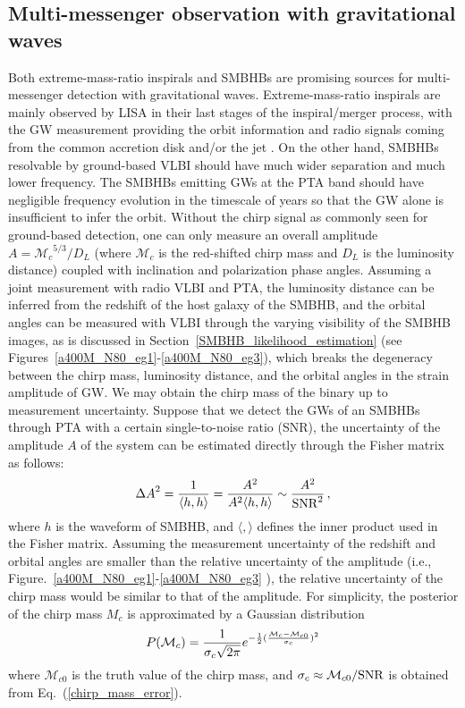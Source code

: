 \documentclass[twocolumn]{aastex62}
\def\m{\begin{eqnarray}}
\def\n{\end{eqnarray}}
\begin{document}
\subsection{Multi-messenger observation with gravitational waves}
\label{multimessenger}
%
Both extreme-mass-ratio inspirals and SMBHBs are promising sources for multi-messenger detection with gravitational waves. Extreme-mass-ratio inspirals are mainly observed by LISA in their last stages of the inspiral/merger process, with the GW measurement providing the orbit information and  radio signals coming from the common accretion disk and/or the jet \citep{Pan:2021ksp,Pan:2021oob}. On the other hand, SMBHBs resolvable by ground-based VLBI should have much wider separation and much lower frequency. The SMBHBs emitting GWs at the PTA band should have negligible frequency evolution in the timescale of years so that the GW alone is insufficient to infer the orbit. Without the chirp signal as commonly seen for ground-based detection, one can only measure an overall amplitude $A = {\mathcal{M}_c}^{5/3}/D_L$ (where $\mathcal{M}_c$ is the red-shifted chirp mass and $D_L$ is the luminosity distance) coupled with inclination and polarization  phase angles. Assuming a joint measurement with radio VLBI and PTA, the luminosity distance can be inferred from the redshift of the host galaxy of the SMBHB, and the orbital angles can be measured with VLBI through the varying visibility of the SMBHB images, as is discussed in Section~\ref{SMBHB_likelihood_estimation} (see Figures~\ref{a400M_N80_eg1}-\ref{a400M_N80_eg3}), which breaks the degeneracy between the chirp mass, luminosity distance, and the orbital angles in the strain amplitude of GW.  
We may obtain the chirp mass of the binary up to measurement uncertainty. 
Suppose that we  detect the GWs of an SMBHBs through PTA with a certain single-to-noise ratio (SNR), the uncertainty of the amplitude $A$ of the system can be estimated directly through the Fisher matrix as follows:
\begin{align} \label{chirp_mass_error}
{\Delta A}^2  = \frac{1}{\langle h,h \rangle} = \frac{A^2}{A^2\langle h,h \rangle} \sim {A^2 \over {\rm SNR}^2}\,,
\end{align}
where $h$ is the waveform of SMBHB, and $\langle,\rangle$ defines the inner product used in the Fisher matrix. Assuming the measurement uncertainty of the redshift and orbital angles are  smaller than the relative uncertainty of the amplitude (i.e., Figure.~\ref{a400M_N80_eg1}-\ref{a400M_N80_eg3} ), the relative uncertainty of the chirp mass would be similar to that of the amplitude. 
For simplicity, the posterior of the chirp mass $M_c$ is approximated by a Gaussian distribution 
\m 
P(\mathcal{M}_c)={1\over \sigma_{c} \sqrt{2 \pi}} e^{-{1\over 2} ({\mathcal{M}_c-\mathcal{M}_{c0} \over \sigma_{c} })^2}
\n
where $\mathcal{M}_{c0}$ is the truth value of the chirp mass, and $\sigma_c \approx \mathcal{M}_{c0}/{\rm SNR}$ is obtained from Eq.~(\ref{chirp_mass_error}). 
\end{document}
